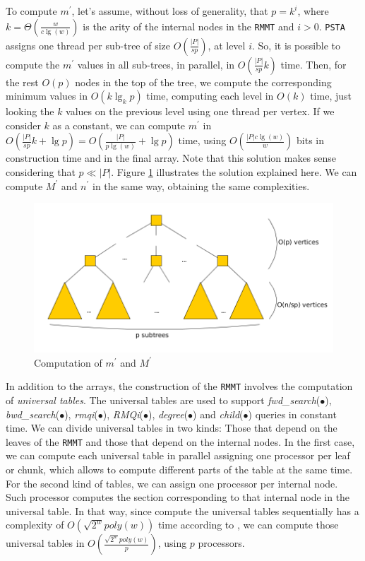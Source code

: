 To compute $m^{\prime}$, let's assume, without loss of generality, that $p = k^{i}$, where $k = \Theta(\frac{w}{c\lg(w)})$ is the arity of the internal nodes in the {\tt RMMT} and $i > 0$. {\tt PSTA} assigns one thread per sub-tree of size $O(\frac{|P|}{sp})$, at level $i$. So, it is possible to compute the $m^{\prime}$ values in all sub-trees, in parallel, in $O(\frac{|P|}{sp}k)$ time. Then, for the rest $O(p)$ nodes in the top of the tree, we compute the corresponding minimum values in $O(k\lg_{k} p)$ time, computing each level in $O(k)$ time, just looking the $k$ values on the previous level using one thread per vertex. If we consider $k$ as a constant, we can compute $m^{\prime}$ in $O(\frac{|P|}{sp}k + \lg p) = O(\frac{|P|}{p\lg(w)}+\lg p)$ time, using $O(\frac{|P|c\lg(w)}{w})$ bits in construction time and in the final array. Note that this solution makes sense considering that $p\ll |P|$. Figure \ref{fig:min-max-array} illustrates the solution explained here. We can compute $M^{\prime}$ and $n^{\prime}$ in the same way, obtaining the same complexities.

	 	\begin{figure}[ht]
			\centering
			\includegraphics[scale=0.28]{./images/Min-Max-array.png}
     		\caption{Computation of $m^{\prime}$ and $M^{\prime}$}
			\label{fig:min-max-array} 
		\end{figure}

	In addition to the arrays, the construction of the {\tt RMMT} involves the computation of \emph{universal tables}. The universal tables are used to support \emph{fwd\_search}($\bullet$), \emph{bwd\_search}($\bullet$), \emph{rmqi}($\bullet$), \emph{RMQi}($\bullet$), \emph{degree}($\bullet$) and \emph{child}($\bullet$) queries in constant time. We can divide universal tables in two kinds: Those that depend on the leaves of the {\tt RMMT} and those that depend on the internal nodes. In the first case, we can compute each universal table in parallel assigning one processor per leaf or chunk, which allows to compute different parts of the table at the same time. For the second kind of tables, we can assign one processor per internal node. Such processor computes the section corresponding to that internal node in the universal table. In that way, since compute the universal tables sequentially has a complexity of $O(\sqrt{2^{w}}poly(w))$ time according to \cite{Navarro:2014:FFS:2620785.2601073}, we can compute those universal tables in $\displaystyle O(\frac{\sqrt{2^{w}}poly(w)}{p})$, using $p$ processors.

